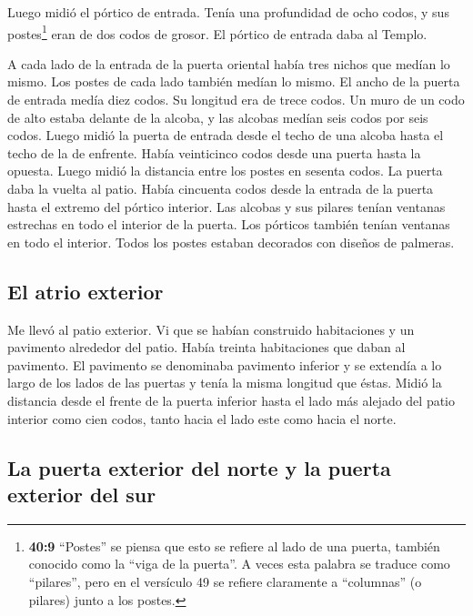  Luego midió el pórtico de entrada.  Tenía
una profundidad de ocho codos, y sus postes\footnote{\textbf{40:9}
  ``Postes'' se piensa que esto se refiere al lado de una puerta,
  también conocido como la ``viga de la puerta''. A veces esta palabra
  se traduce como ``pilares'', pero en el versículo 49 se refiere
  claramente a ``columnas'' (o pilares) junto a los postes.} eran de dos
codos de grosor. El pórtico de entrada daba al Templo.

 A cada lado de la entrada de la puerta oriental había
tres nichos que medían lo mismo. Los postes de cada lado también medían
lo mismo.  El ancho de la puerta de entrada medía diez
codos. Su longitud era de trece codos.  Un muro de un
codo de alto estaba delante de la alcoba, y las alcobas medían seis
codos por seis codos.  Luego midió la puerta de entrada
desde el techo de una alcoba hasta el techo de la de enfrente. Había
veinticinco codos desde una puerta hasta la opuesta. 
Luego midió la distancia entre los postes en sesenta codos. La puerta
daba la vuelta al patio.  Había cincuenta codos desde la
entrada de la puerta hasta el extremo del pórtico interior.
 Las alcobas y sus pilares tenían ventanas estrechas en
todo el interior de la puerta. Los pórticos también tenían ventanas en
todo el interior. Todos los postes estaban decorados con diseños de
palmeras.

\hypertarget{el-atrio-exterior}{%
\subsection{El atrio exterior}\label{el-atrio-exterior}}

 Me llevó al patio exterior. Vi que se habían construido
habitaciones y un pavimento alrededor del patio. Había treinta
habitaciones que daban al pavimento.  El pavimento se
denominaba pavimento inferior y se extendía a lo largo de los lados de
las puertas y tenía la misma longitud que éstas.  Midió
la distancia desde el frente de la puerta inferior hasta el lado más
alejado del patio interior como cien codos, tanto hacia el lado este
como hacia el norte.

\hypertarget{la-puerta-exterior-del-norte-y-la-puerta-exterior-del-sur}{%
\subsection{La puerta exterior del norte y la puerta exterior del
sur}\label{la-puerta-exterior-del-norte-y-la-puerta-exterior-del-sur}}


